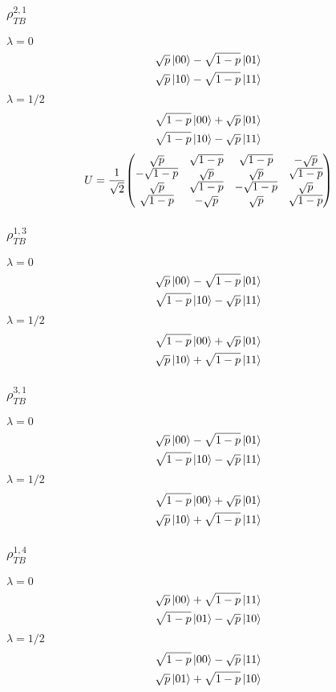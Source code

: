 \documentclass[12pt]{article}
\begin{document}
\subsubsection*{$\rho_{TB}^{2,1}$}
$\lambda = 0$
\begin{align*}
    \sqrt{p}\ket{00} - \sqrt{1-p}\ket{01} \\
    \sqrt{p}\ket{10} - \sqrt{1-p}\ket{11} 
\end{align*}
$\lambda = 1/2$
\begin{align*}
    \sqrt{1-p}\ket{00} + \sqrt{p}\ket{01} \\
    \sqrt{1-p}\ket{10} - \sqrt{p}\ket{11}
\end{align*}
\[ U = \frac{1}{\sqrt{2}}\mqty(\sqrt{p}&\sqrt{1-p}&\sqrt{1-p}&-\sqrt{p}\\-\sqrt{1-p}&\sqrt{p}&\sqrt{p}&\sqrt{1-p}\\\sqrt{p}&\sqrt{1-p}&-\sqrt{1-p}&\sqrt{p}\\\sqrt{1-p}&-\sqrt{p}&\sqrt{p}&\sqrt{1-p}) \]


\subsubsection*{$\rho_{TB}^{1,3}$}
$\lambda = 0$
\begin{align*}
    \sqrt{p}\ket{00} - \sqrt{1-p}\ket{01} \\
    \sqrt{1-p}\ket{10} - \sqrt{p}\ket{11}
\end{align*}
$\lambda = 1/2$
\begin{align*}
    \sqrt{1-p}\ket{00} + \sqrt{p}\ket{01} \\
    \sqrt{p}\ket{10} + \sqrt{1-p}\ket{11}
\end{align*}

\subsubsection*{$\rho_{TB}^{3,1}$}
$\lambda = 0$
\begin{align*}
    \sqrt{p}\ket{00} - \sqrt{1-p}\ket{01} \\
    \sqrt{1-p}\ket{10} - \sqrt{p}\ket{11}
\end{align*}
$\lambda = 1/2$
\begin{align*}
    \sqrt{1-p}\ket{00} + \sqrt{p}\ket{01} \\
    \sqrt{p}\ket{10} + \sqrt{1-p}\ket{11}
\end{align*}

\subsubsection*{$\rho_{TB}^{1,4}$}
$\lambda = 0$
\begin{align*}
    \sqrt{p}\ket{00} + \sqrt{1-p}\ket{11} \\
    \sqrt{1-p}\ket{01} - \sqrt{p}\ket{10}
\end{align*}
$\lambda = 1/2$
\begin{align*}
    \sqrt{1-p}\ket{00} - \sqrt{p}\ket{11} \\
    \sqrt{p}\ket{01} + \sqrt{1-p}\ket{10}
\end{align*}
\end{document}
